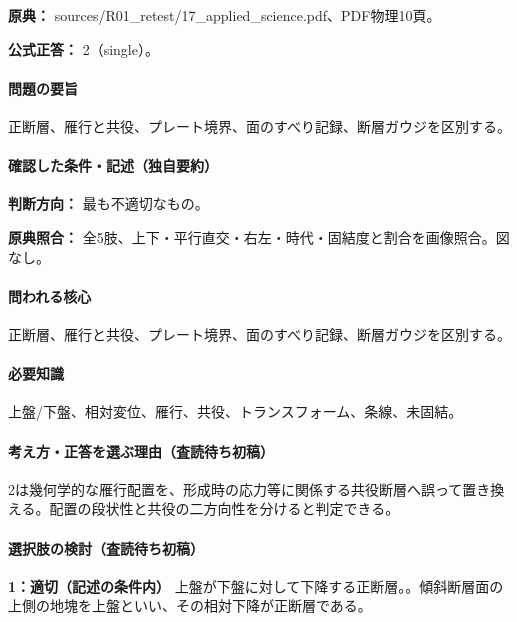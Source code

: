 \noindent\textbf{原典：} sources/R01\_retest/17\_applied\_science.pdf、PDF物理10頁。

\textbf{公式正答：} 2（single）。

\paragraph{問題の要旨} 正断層、雁行と共役、プレート境界、面のすべり記録、断層ガウジを区別する。

\paragraph{確認した条件・記述（独自要約）}\mbox{}\par

\noindent\textbf{判断方向：} 最も不適切なもの。\par

\noindent\textbf{原典照合：} 全5肢、上下・平行直交・右左・時代・固結度と割合を画像照合。図なし。\par

\paragraph{問われる核心} 正断層、雁行と共役、プレート境界、面のすべり記録、断層ガウジを区別する。

\paragraph{必要知識} 上盤/下盤、相対変位、雁行、共役、トランスフォーム、条線、未固結。

\paragraph{考え方・正答を選ぶ理由（査読待ち初稿）} 2は幾何学的な雁行配置を、形成時の応力等に関係する共役断層へ誤って置き換える。配置の段状性と共役の二方向性を分けると判定できる。

\paragraph{選択肢の検討（査読待ち初稿）}\mbox{}\par

\noindent\textbf{1：適切（記述の条件内）} 上盤が下盤に対して下降する正断層。。傾斜断層面の上側の地塊を上盤といい、その相対下降が正断層である。\par

